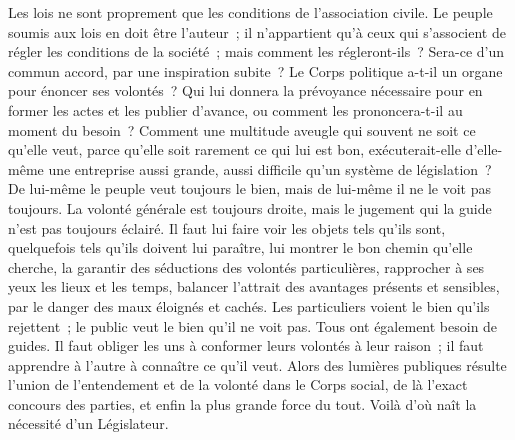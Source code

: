 \documentclass[french,twoside]{book} %
\begin{document}
Les lois ne sont proprement que les conditions de l’association civile. Le peuple soumis aux lois en doit être l’auteur ; il n’appartient qu’à ceux qui s’associent de régler les conditions de la société ; mais comment les régleront-ils ? Sera-ce d’un commun accord, par une inspiration subite ? Le Corps politique a-t-il un organe pour énoncer ses volontés ? Qui lui donnera la prévoyance nécessaire pour en former les actes et les publier d’avance, ou comment les prononcera-t-il au moment du besoin ? Comment une multitude aveugle qui souvent ne soit ce qu’elle veut, parce qu’elle soit rarement ce qui lui est bon, exécuterait-elle d’elle-même une entreprise aussi grande, aussi difficile qu’un système de législation ? De lui-même le peuple veut toujours le bien, mais de lui-même il ne le voit pas toujours. La volonté générale est toujours droite, mais le jugement qui la guide n’est pas toujours éclairé. Il faut lui faire voir les objets tels qu’ils sont, quelquefois tels qu’ils doivent lui paraître, lui montrer le bon chemin qu’elle cherche, la garantir des séductions des volontés particulières, rapprocher à ses yeux les lieux et les temps, balancer l’attrait des avantages présents et sensibles, par le danger des maux éloignés et cachés. Les particuliers voient le bien qu’ils rejettent ; le public veut le bien qu’il ne voit pas. Tous ont également besoin de guides. Il faut obliger les uns à conformer leurs volontés à leur raison ; il faut apprendre à l’autre à connaître ce qu’il veut. Alors des lumières publiques résulte l’union de l’entendement et de la volonté dans le Corps social, de là l’exact concours des parties, et enfin la plus grande force du tout. Voilà d’où naît la nécessité d’un Législateur.
\end{document}
